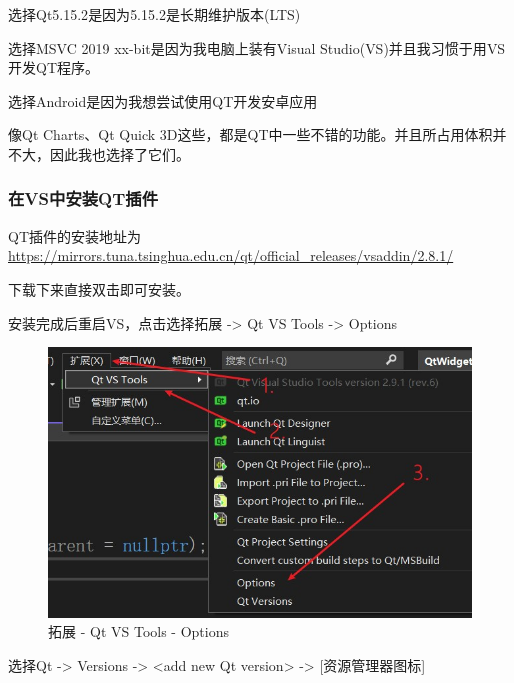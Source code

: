 \documentclass[cs4size,a4paper]{ctexart}
\numberwithin{equation}{section}
\numberwithin{table}{section}
\numberwithin{figure}{section}
\begin{document}
选择\colorbox{LetMeFlyGray}{Qt5.15.2}是因为\colorbox{LetMeFlyGray}{5.15.2}是长期维护版本(\colorbox{LetMeFlyGray}{LTS})

选择\colorbox{LetMeFlyGray}{MSVC 2019 xx-bit}是因为我电脑上装有\colorbox{LetMeFlyGray}{Visual Studio}(\colorbox{LetMeFlyGray}{VS})并且我习惯于用\colorbox{LetMeFlyGray}{VS}开发\colorbox{LetMeFlyGray}{QT}程序。

选择\colorbox{LetMeFlyGray}{Android}是因为我想尝试使用QT开发安卓应用

像\colorbox{LetMeFlyGray}{Qt Charts}、\colorbox{LetMeFlyGray}{Qt Quick 3D}这些，都是QT中一些不错的功能。并且所占用体积并不大，因此我也选择了它们。

\subsubsection{在VS中安装QT插件}

QT插件的安装地址为\url{https://mirrors.tuna.tsinghua.edu.cn/qt/official_releases/vsaddin/2.8.1/}

下载下来直接双击即可安装。

安装完成后重启VS，点击选择\colorbox{LetMeFlyGray}{拓展 -> Qt VS Tools -> Options}

\begin{figure}[H]
\small
\centering
\includegraphics{拓展 - Qt VS Tools - Options.jpg}
\caption{拓展 - Qt VS Tools - Options} \label{fig:拓展 - Qt VS Tools - Options}
\end{figure}

选择\colorbox{LetMeFlyGray}{Qt -> Versions -> <add new Qt version> -> [资源管理器图标]}
\end{document}
